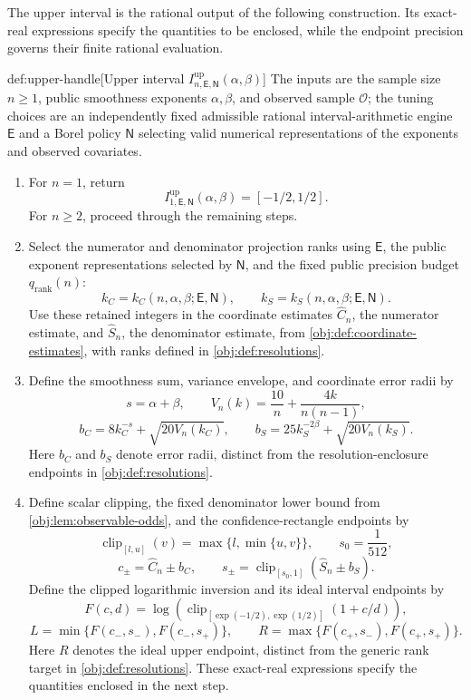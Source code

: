 The upper interval  is the rational output of the following construction. Its exact-real expressions specify the quantities to be enclosed, while the endpoint precision  governs their finite rational evaluation.

\begin{algorithmv}{def:upper-handle}[Upper interval $I^{\mathrm{up}}_{n,\mathsf E,\mathsf N}(\alpha,\beta)$]
The inputs are the sample size \(n\ge1\), public smoothness exponents \(\alpha,\beta\), and observed sample \(\mathcal O\); the tuning choices are an independently fixed admissible rational interval-arithmetic engine \(\mathsf E\) and a Borel policy \(\mathsf N\) selecting valid numerical representations of the exponents and observed covariates.
\begin{enumerate}
\item For \(n=1\), return
\[
I^{\mathrm{up}}_{1,\mathsf E,\mathsf N}(\alpha,\beta)
=[-1/2,1/2].
\]
For \(n\ge2\), proceed through the remaining steps.

\item Select the numerator and denominator projection ranks using \(\mathsf E\), the public exponent representations selected by \(\mathsf N\), and the fixed public precision budget \(q_{\mathrm{rank}}(n)\):
\[
k_C=k_C(n,\alpha,\beta;\mathsf E,\mathsf N),
\qquad
k_S=k_S(n,\alpha,\beta;\mathsf E,\mathsf N).
\]
Use these retained integers in the coordinate estimates \(\widehat C_n\), the numerator estimate, and \(\widehat S_n\), the denominator estimate, from \cref{obj:def:coordinate-estimates}, with ranks defined in \cref{obj:def:resolutions}.

\item Define the smoothness sum, variance envelope, and coordinate error radii by
\[
s=\alpha+\beta,\qquad
V_n(k)=\frac{10}{n}+\frac{4k}{n(n-1)},
\]
\[
b_C=8k_C^{-s}+\sqrt{20V_n(k_C)},
\qquad
b_S=25k_S^{-2\beta}+\sqrt{20V_n(k_S)}.
\]
Here \(b_C\) and \(b_S\) denote error radii, distinct from the resolution-enclosure endpoints in \cref{obj:def:resolutions}.

\item Define scalar clipping, the fixed denominator lower bound from \cref{obj:lem:observable-odds}, and the confidence-rectangle endpoints by
\[
\operatorname{clip}_{[l,u]}(v)=\max\{l,\min\{u,v\}\},
\qquad s_0=\frac{1}{512},
\]
\[
c_\pm=\widehat C_n\pm b_C,
\qquad
s_\pm=\operatorname{clip}_{[s_0,1]}(\widehat S_n\pm b_S).
\]
Define the clipped logarithmic inversion and its ideal interval endpoints by
\[
F(c,d)=
\log\!\left(
\operatorname{clip}_{[\exp(-1/2),\exp(1/2)]}(1+c/d)
\right),
\]
\[
L=\min\{F(c_-,s_-),F(c_-,s_+)\},
\qquad
R=\max\{F(c_+,s_-),F(c_+,s_+)\}.
\]
Here \(R\) denotes the ideal upper endpoint, distinct from the generic rank target in \cref{obj:def:resolutions}. These exact-real expressions specify the quantities enclosed in the next step.


\end{enumerate}
\end{algorithmv}
